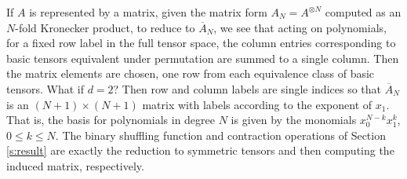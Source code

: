 \documentclass[12pt]{article}    %
\begin{document}
If $A$ is represented by a matrix, given the matrix form 
$A_N=A^{\otimes N}$ computed as an $N$-fold Kronecker product, to reduce
to $\overline{A}_N$, we see that acting on polynomials, for a fixed row
label in the full tensor space, the column entries corresponding to
basic tensors equivalent under permutation are summed to a single
column. Then the matrix elements are chosen, one row from each
equivalence class of basic tensors. What if $d=2$? Then row and column
labels are single indices so that $\overline{A}_N$ is an 
$(N+1)\times(N+1)$ matrix with labels according to the exponent of $x_1$.
That is, the basis for polynomials in degree $N$ is given by the
monomials $x_0^{N-k}x_1^k$, $0\le k\le N$. The binary shuffling
function and contraction operations of Section \ref{s:result} 
are exactly the reduction to symmetric tensors and then computing 
the induced matrix, respectively. 
\end{document}
